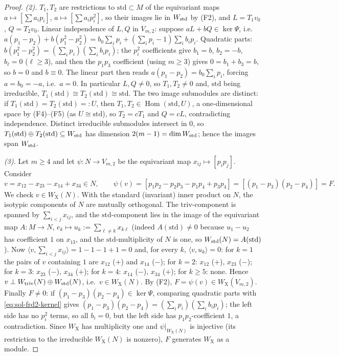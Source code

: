 \documentclass[../main.tex]{subfiles}
\begin{document}
\begin{proof}
\emph{(2).}
$T_1,T_2$ are restrictions to $\mathrm{std}\subset M$ of the equivariant maps
$a\mapsto[\sum a_ip_i]$, $a\mapsto[\sum a_ip_i^2]$, so their images lie in
$W_{\rm std}$ by (F2), and $L=T_1v_0$, $Q=T_2v_0$.  Linear independence of $L,Q$ in
$V_{m,2}$: suppose $aL+bQ\in\ker\Psi$, i.e.
$a(p_1-p_2)+b(p_1^2-p_2^2)
 =b_0\sum_ip_i+(\sum_ip_i-1)\sum_ib_ip_i$.
Quadratic parts: $b(p_1^2-p_2^2)=(\sum_ip_i)(\sum_ib_ip_i)$; the $p_i^2$
coefficients give $b_1=b$, $b_2=-b$, $b_\ell=0$ ($\ell\ge3$), and then the
$p_1p_3$ coefficient (using $m\ge3$) gives $0=b_1+b_3=b$, so $b=0$ and $b\equiv0$.
The linear part then reads $a(p_1-p_2)=b_0\sum_ip_i$, forcing $a=b_0=-a$, i.e.\
$a=0$.  In particular $L,Q\ne0$, so $T_1,T_2\ne0$ and, $\mathrm{std}$ being
irreducible, $T_1(\mathrm{std})\cong T_2(\mathrm{std})\cong\mathrm{std}$.  The two
image submodules are distinct: if $T_1(\mathrm{std})=T_2(\mathrm{std})=:U$, then
$T_1,T_2\in\operatorname{Hom}(\mathrm{std},U)$, a one-dimensional space by (F4)--(F5)
(as $U\cong\mathrm{std}$), so $T_2=cT_1$ and $Q=cL$, contradicting independence.
Distinct irreducible submodules intersect in $0$, so
$T_1(\mathrm{std})\oplus T_2(\mathrm{std})\subseteq W_{\rm std}$ has dimension
$2(m-1)=\dim W_{\rm std}$; hence the images span $W_{\rm std}$.

\emph{(3).}
Let $m\ge4$ and let $\psi:N\to V_{m,2}$ be the equivariant map
$x_{ij}\mapsto[p_ip_j]$.  Consider
\[
  v=x_{12}-x_{23}-x_{14}+x_{34}\in N,
  \qquad
  \psi(v)=[p_1p_2-p_2p_3-p_1p_4+p_3p_4]=[(p_1-p_3)(p_2-p_4)]=F.
\]
We check $v\in W_{\mathrm X}(N)$.  With the standard (invariant) inner product on
$N$, the isotypic components of $N$ are mutually orthogonal.  The
$\mathrm{triv}$-component is spanned by $\sum_{i<j}x_{ij}$, and the
$\mathrm{std}$-component lies in the image of the equivariant map $A:M\to N$,
$e_k\mapsto u_k:=\sum_{\ell\ne k}x_{k\ell}$ (indeed $A(\mathrm{std})\ne0$ because
$u_1-u_2$ has coefficient $1$ on $x_{13}$, and the $\mathrm{std}$-multiplicity of $N$
is one, so $W_{\rm std}(N)=A(\mathrm{std})$).  Now
$\langle v,\sum_{i<j}x_{ij}\rangle=1-1-1+1=0$ and, for every $k$,
$\langle v,u_k\rangle=0$: for $k=1$ the pairs of $v$ containing $1$ are
$x_{12}$ ($+$) and $x_{14}$ ($-$); for $k=2$: $x_{12}$ ($+$), $x_{23}$ ($-$); for
$k=3$: $x_{23}$ ($-$), $x_{34}$ ($+$); for $k=4$: $x_{14}$ ($-$), $x_{34}$ ($+$);
for $k\ge5$: none.  Hence $v\perp W_{\rm triv}(N)\oplus W_{\rm std}(N)$, i.e.\
$v\in W_{\mathrm X}(N)$.  By (F2), $F=\psi(v)\in W_{\mathrm X}(V_{m,2})$.  Finally
$F\ne0$: if $(p_1-p_3)(p_2-p_4)\in\ker\Psi$, comparing quadratic parts with
\eqref{eq:sol-frd2-kernel} gives
$(p_1-p_3)(p_2-p_4)=(\sum_ip_i)(\sum_ib_ip_i)$; the left side has no $p_i^2$ terms,
so all $b_i=0$, but the left side has $p_1p_2$-coefficient $1$, a contradiction.
Since $W_{\mathrm X}$ has multiplicity one and $\psi|_{W_{\mathrm X}(N)}$ is
injective (its restriction to the irreducible $W_{\mathrm X}(N)$ is nonzero), $F$
generates $W_{\mathrm X}$ as a module.
\end{proof}
\end{document}
